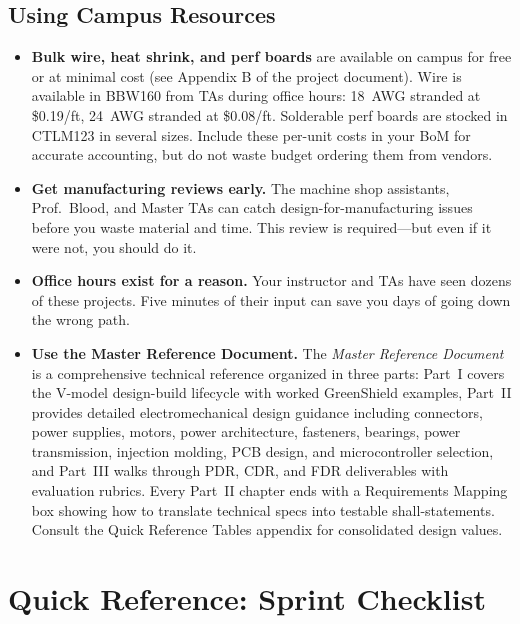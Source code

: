 \documentclass[11pt,letterpaper]{article}
\begin{document}
\subsection{Using Campus Resources}

\begin{itemize}[leftmargin=*, itemsep=4pt]
    \item \textbf{Bulk wire, heat shrink, and perf boards} are available on campus for free or at minimal cost (see Appendix B of the project document). Wire is available in BBW160 from TAs during office hours: 18~AWG stranded at \$0.19/ft, 24~AWG stranded at \$0.08/ft. Solderable perf boards are stocked in CTLM123 in several sizes. Include these per-unit costs in your BoM for accurate accounting, but do not waste budget ordering them from vendors.
    \item \textbf{Get manufacturing reviews early.} The machine shop assistants, Prof.\ Blood, and Master TAs can catch design-for-manufacturing issues before you waste material and time. This review is required---but even if it were not, you should do it.
    \item \textbf{Office hours exist for a reason.} Your instructor and TAs have seen dozens of these projects. Five minutes of their input can save you days of going down the wrong path.
    \item \textbf{Use the Master Reference Document.} The \textit{Master Reference Document} is a comprehensive technical reference organized in three parts: Part~I covers the V-model design-build lifecycle with worked GreenShield examples, Part~II provides detailed electromechanical design guidance including connectors, power supplies, motors, power architecture, fasteners, bearings, power transmission, injection molding, PCB design, and microcontroller selection, and Part~III walks through PDR, CDR, and FDR deliverables with evaluation rubrics. Every Part~II chapter ends with a Requirements Mapping box showing how to translate technical specs into testable shall-statements. Consult the Quick Reference Tables appendix for consolidated design values.
\end{itemize}

\section{Quick Reference: Sprint Checklist}
\end{document}
